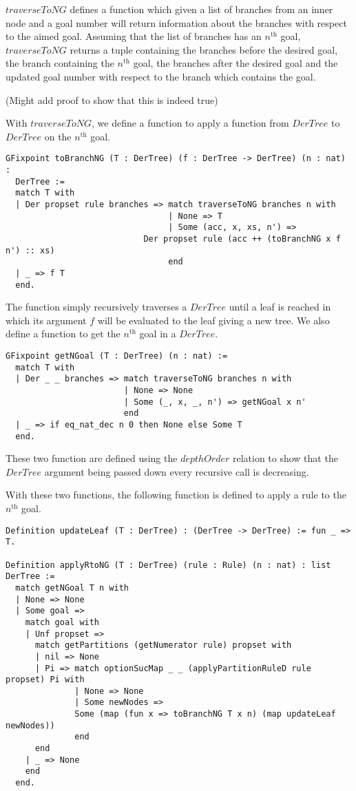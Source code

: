 $traverseToNG$ defines a function which given a list of branches from an inner
node and a goal number will return information about the branches with respect
to the aimed goal. Assuming that the list of branches has an $n^{\text{th}}$
goal, $traverseToNG$ returns a tuple containing the branches before the desired
goal, the branch containing the $n^{\text{th}}$ goal, the branches after the
desired goal and the updated goal number with respect to the branch which
contains the goal.

(Might add proof to show that this is indeed true)

With $traverseToNG$, we define a function to apply a function from $DerTree$ to
$DerTree$ on the $n^{\text{th}}$ goal.

\begin{lstlisting}
GFixpoint toBranchNG (T : DerTree) (f : DerTree -> DerTree) (n : nat) :
  DerTree :=
  match T with
  | Der propset rule branches => match traverseToNG branches n with
                                 | None => T
                                 | Some (acc, x, xs, n') =>
                            Der propset rule (acc ++ (toBranchNG x f n') :: xs)
                                 end
  | _ => f T
  end.
\end{lstlisting}

The function simply recursively traverses a $DerTree$ until a leaf is reached
in which its argument $f$ will be evaluated to the leaf giving a new tree.
We also define a function to get the $n^{\text{th}}$ goal in a $DerTree$.

\begin{lstlisting}
GFixpoint getNGoal (T : DerTree) (n : nat) :=
  match T with
  | Der _ _ branches => match traverseToNG branches n with
                        | None => None
                        | Some (_, x, _, n') => getNGoal x n'
                        end
  | _ => if eq_nat_dec n 0 then None else Some T
  end.
\end{lstlisting}

These two function are defined using the $depthOrder$ relation to show that the
$DerTree$ argument being passed down every recursive call is decreasing.

With these two functions, the following function is defined to apply a rule to
the $n^{\text{th}}$ goal.

\begin{lstlisting}
Definition updateLeaf (T : DerTree) : (DerTree -> DerTree) := fun _ => T.

Definition applyRtoNG (T : DerTree) (rule : Rule) (n : nat) : list DerTree :=
  match getNGoal T n with
  | None => None
  | Some goal => 
    match goal with
    | Unf propset =>
      match getPartitions (getNumerator rule) propset with
      | nil => None
      | Pi => match optionSucMap _ _ (applyPartitionRuleD rule propset) Pi with
              | None => None
              | Some newNodes =>
              Some (map (fun x => toBranchNG T x n) (map updateLeaf newNodes))
              end
      end
    | _ => None
    end
  end.
\end{lstlisting}

